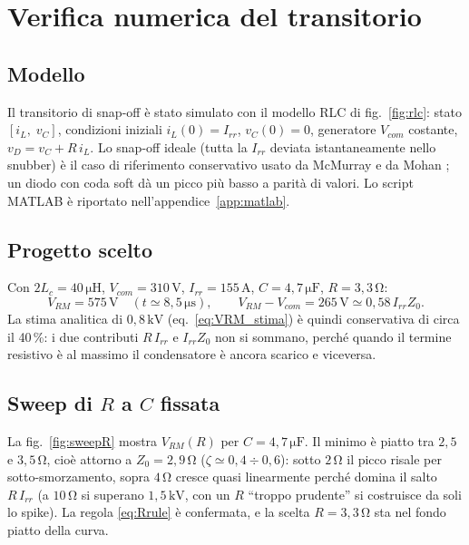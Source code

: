 \documentclass[11pt,a4paper]{article}
\newcommand{\unit}[1]{\,\mathrm{#1}}
\begin{document}
\section{Verifica numerica del transitorio}
\label{sec:verifica}

\subsection{Modello}

Il transitorio di snap-off \`e stato simulato con il modello RLC di
fig.~\ref{fig:rlc}: stato $[i_L,\; v_C]$, condizioni iniziali
$i_L(0)=I_{rr}$, $v_C(0)=0$, generatore $V_{com}$ costante,
$v_D = v_C + R\,i_L$. Lo snap-off ideale (tutta la $I_{rr}$ deviata
istantaneamente nello snubber) \`e il caso di riferimento conservativo
usato da McMurray \cite{mcmurray} e da Mohan \cite{mohan}; un diodo con
coda soft d\`a un picco pi\`u basso a parit\`a di valori. Lo script MATLAB
\`e riportato nell'appendice~\ref{app:matlab}.

\subsection{Progetto scelto}

Con $2L_c = 40\unit{\mu H}$, $V_{com}=310\unit{V}$, $I_{rr}=155\unit{A}$,
$C=4{,}7\unit{\mu F}$, $R=3{,}3\unit{\Omega}$:
\begin{equation}
V_{RM} = 575\unit{V} \quad (t \simeq 8{,}5\unit{\mu s}),
\qquad
V_{RM}-V_{com} = 265\unit{V} \simeq 0{,}58\, I_{rr} Z_0 .
\end{equation}
La stima analitica di $0{,}8\unit{kV}$ (eq.~\ref{eq:VRM_stima}) \`e quindi
conservativa di circa il 40\,\%: i due contributi $R\,I_{rr}$ e
$I_{rr}Z_0$ non si sommano, perch\'e quando il termine resistivo \`e al
massimo il condensatore \`e ancora scarico e viceversa.

\subsection{Sweep di $R$ a $C$ fissata}

La fig.~\ref{fig:sweepR} mostra $V_{RM}(R)$ per $C=4{,}7\unit{\mu F}$. Il
minimo \`e piatto tra $2{,}5$ e $3{,}5\unit{\Omega}$, cio\`e attorno a
$Z_0 = 2{,}9\unit{\Omega}$ ($\zeta \simeq 0{,}4\div0{,}6$): sotto
$2\unit{\Omega}$ il picco risale per sotto-smorzamento, sopra
$4\unit{\Omega}$ cresce quasi linearmente perch\'e domina il salto
$R\,I_{rr}$ (a $10\unit{\Omega}$ si superano $1{,}5\unit{kV}$, con un
$R$ ``troppo prudente'' si costruisce da soli lo spike). La regola
\eqref{eq:Rrule} \`e confermata, e la scelta $R = 3{,}3\unit{\Omega}$
sta nel fondo piatto della curva.
\end{document}
